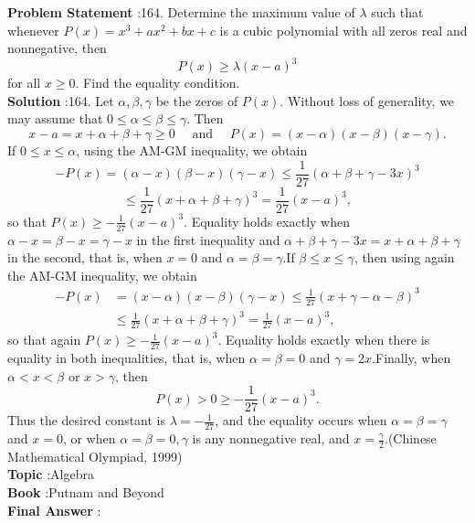 \documentclass[10pt]{article}
\begin{document}
\textbf{Problem Statement} :164. Determine the maximum value of $\lambda$ such that whenever $P(x)=x^{3}+a x^{2}+b x+c$ is a cubic polynomial with all zeros real and nonnegative, then$$ P(x) \geq \lambda(x-a)^{3} $$for all $x \geq 0$. Find the equality condition.\\
\textbf{Solution} :164. Let $\alpha, \beta, \gamma$ be the zeros of $P(x)$. Without loss of generality, we may assume that $0 \leq \alpha \leq \beta \leq \gamma$. Then$$ x-a=x+\alpha+\beta+\gamma \geq 0 \quad \text { and } \quad P(x)=(x-\alpha)(x-\beta)(x-\gamma) . $$If $0 \leq x \leq \alpha$, using the AM-GM inequality, we obtain$$ -P(x)=(\alpha-x)(\beta-x)(\gamma-x) \leq \frac{1}{27}(\alpha+\beta+\gamma-3 x)^{3} $$$$ \leq \frac{1}{27}(x+\alpha+\beta+\gamma)^{3}=\frac{1}{27}(x-a)^{3}, $$so that $P(x) \geq-\frac{1}{27}(x-a)^{3}$. Equality holds exactly when $\alpha-x=\beta-x=\gamma-x$ in the first inequality and $\alpha+\beta+\gamma-3 x=x+\alpha+\beta+\gamma$ in the second, that is, when $x=0$ and $\alpha=\beta=\gamma$.If $\beta \leq x \leq \gamma$, then using again the AM-GM inequality, we obtain$$ \begin{aligned} -P(x) &=(x-\alpha)(x-\beta)(\gamma-x) \leq \frac{1}{27}(x+\gamma-\alpha-\beta)^{3} \\ & \leq \frac{1}{27}(x+\alpha+\beta+\gamma)^{3}=\frac{1}{27}(x-a)^{3}, \end{aligned} $$so that again $P(x) \geq-\frac{1}{27}(x-a)^{3}$. Equality holds exactly when there is equality in both inequalities, that is, when $\alpha=\beta=0$ and $\gamma=2 x$.Finally, when $\alpha<x<\beta$ or $x>\gamma$, then$$ P(x)>0 \geq-\frac{1}{27}(x-a)^{3} . $$Thus the desired constant is $\lambda=-\frac{1}{27}$, and the equality occurs when $\alpha=\beta=\gamma$ and $x=0$, or when $\alpha=\beta=0, \gamma$ is any nonnegative real, and $x=\frac{\gamma}{2}$.(Chinese Mathematical Olympiad, 1999)\\
\textbf{Topic} :Algebra\\
\textbf{Book} :Putnam and Beyond\\
\textbf{Final Answer} :\\
\end{document}
